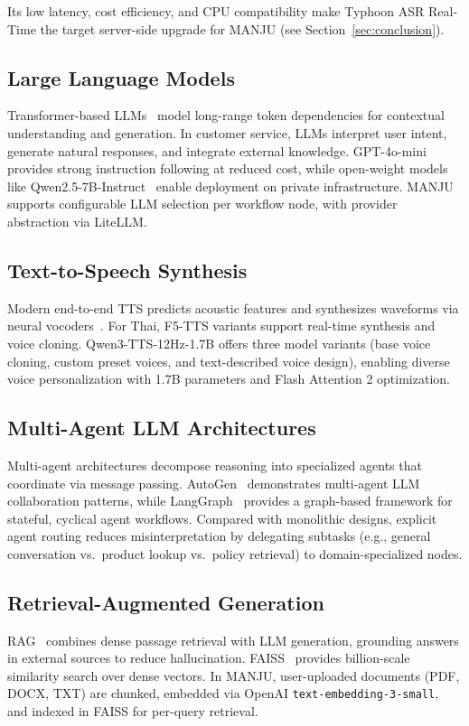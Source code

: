 \documentclass[10pt, a4paper, twocolumn]{article}
\begin{document}
\noindent Its low latency, cost efficiency, and CPU compatibility make Typhoon ASR Real-Time the target server-side upgrade for MANJU (see Section~\ref{sec:conclusion}).

\subsection{Large Language Models}
Transformer-based LLMs~\cite{vaswani2017attention} model long-range token dependencies for contextual understanding and generation.
In customer service, LLMs interpret user intent, generate natural responses, and integrate external knowledge.
GPT-4o-mini~\cite{openai2024gpt4o} provides strong instruction following at reduced cost, while open-weight models like Qwen2.5-7B-Instruct~\cite{qwen2024qwen25} enable deployment on private infrastructure.
MANJU supports configurable LLM selection per workflow node, with provider abstraction via LiteLLM.

\subsection{Text-to-Speech Synthesis}
Modern end-to-end TTS predicts acoustic features and synthesizes waveforms via neural vocoders~\cite{tan2021ttssurvey}.
For Thai, F5-TTS variants support real-time synthesis and voice cloning.
Qwen3-TTS-12Hz-1.7B offers three model variants (base voice cloning, custom preset voices, and text-described voice design), enabling diverse voice personalization with 1.7B parameters and Flash Attention 2 optimization.

\subsection{Multi-Agent LLM Architectures}
Multi-agent architectures decompose reasoning into specialized agents that coordinate via message passing.
AutoGen~\cite{wu2023autogen} demonstrates multi-agent LLM collaboration patterns, while LangGraph~\cite{langgraph2024} provides a graph-based framework for stateful, cyclical agent workflows.
Compared with monolithic designs, explicit agent routing reduces misinterpretation by delegating subtasks (e.g., general conversation vs.\ product lookup vs.\ policy retrieval) to domain-specialized nodes.

\subsection{Retrieval-Augmented Generation}
RAG~\cite{lewis2020rag} combines dense passage retrieval with LLM generation, grounding answers in external sources to reduce hallucination.
FAISS~\cite{johnson2019faiss} provides billion-scale similarity search over dense vectors.
In MANJU, user-uploaded documents (PDF, DOCX, TXT) are chunked, embedded via OpenAI \texttt{text-embedding-3-small}, and indexed in FAISS for per-query retrieval.
\end{document}
